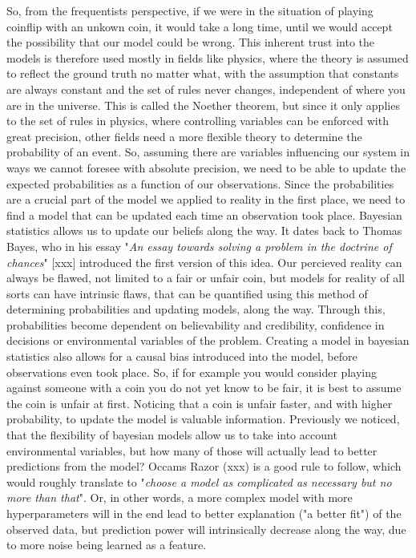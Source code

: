 So, from the frequentists perspective, if we were in the situation of playing coinflip with an unkown coin, it would take a long time, until we would accept the possibility that our model could be wrong. This inherent trust into the models is therefore used mostly in fields like physics, where the theory is assumed to reflect the ground truth no matter what, with the assumption that constants are always constant and the set of rules never changes, independent of where you are in the universe. This is called the Noether theorem, but since it only applies to the set of rules in physics, where controlling variables can be enforced with great precision, other fields need a more flexible theory to determine the probability of an event. So, assuming there are variables influencing our system in ways we cannot foresee with absolute precision, we need to be able to update the expected probabilities as a function of our observations. Since the probabilities are a crucial part of the model we applied to reality in the first place, we need to find a model that can be updated each time an observation took place. Bayesian statistics allows us to update our beliefs along the way. It dates back to Thomas Bayes, who in his essay "\textit{An essay towards solving a problem in the doctrine of chances}" [xxx] introduced the first version of this idea. Our percieved reality can always be flawed, not limited to a fair or unfair coin, but models for reality of all sorts can have intrinsic flaws, that can be quantified using this method of determining probabilities and updating models, along the way. Through this, probabilities become dependent on believability and credibility, confidence in decisions or environmental variables of the problem. Creating a model in bayesian statistics also allows for a causal bias introduced into the model, before observations even took place. So, if for example you would consider playing against someone with a coin you do not yet know to be fair, it is best to assume the coin is unfair at first. Noticing that a coin is unfair faster, and with higher probability, to update the model is valuable information. Previously we noticed, that the flexibility of bayesian models allow us to take into account environmental variables, but how many of those will actually lead to better predictions from the model? Occams Razor (xxx) is a good rule to follow, which would roughly translate to "\textit{choose a model as complicated as necessary but no more than that}". Or, in other words, a more complex model with more hyperparameters will in the end lead to better explanation ("a better fit") of the observed data, but prediction power will intrinsically decrease along the way, due to more noise being learned as a feature. 
